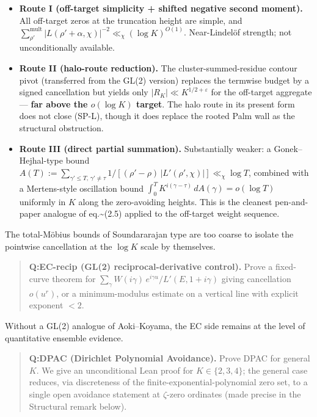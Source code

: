 \begin{itemize}
\item
  \textbf{Route I (off-target simplicity + shifted negative second
  moment).} All off-target zeros at the truncation height are
  simple, and
  \(\sum_{\rho'}^\mathrm{mult} |L(\rho' + \alpha,\chi)|^{-2} \ll_\chi (\log K)^{O(1)}\).
  Near-Lindelöf strength; not unconditionally available.
\item
  \textbf{Route II (halo-route reduction).} The cluster-summed-residue
  contour pivot (transferred from the GL(2) version) replaces the
  termwise budget by a signed cancellation but yields only
  \(|R_K| \ll K^{1/2 + \varepsilon}\) for the off-target aggregate ---
  \textbf{far above the \(o(\log K)\) target}. The halo route in its
  present form does not close (SP-L), though it does replace the
  rooted Palm wall as the structural obstruction.
\item
  \textbf{Route III (direct partial summation).} Substantially weaker:
  a Gonek--Hejhal-type bound
  \(A(T) := \sum_{\gamma' \le T,\, \gamma' \ne \tau}
  1/[(\rho' - \rho)\,|L'(\rho', \chi)|] \ll_\chi \log T\), combined
  with a Mertens-style oscillation bound
  \(\int_0^T K^{i(\gamma - \tau)}\, dA(\gamma) = o(\log T)\) uniformly
  in \(K\) along the zero-avoiding heights. This is the cleanest
  pen-and-paper analogue of \cite{AkatsukaH2013EulerProduct} eq.\textasciitilde(2.5) applied to the
  off-target weight sequence.
\end{itemize}

The total-Möbius bounds of Soundararajan type are too coarse to
isolate the pointwise cancellation at the \(\log K\) scale by
themselves.

\begin{quote}
\textbf{Q:EC-recip (GL(2) reciprocal-derivative control).} Prove a
fixed-curve theorem for
\(\sum_\gamma \widehat W(i\gamma)\,e^{i\gamma u} / L'(E, 1 + i\gamma)\)
giving cancellation \(o(u^r)\), or a minimum-modulus estimate
on a vertical line with explicit exponent \(< 2\).
\end{quote}

Without a GL(2) analogue of Aoki--Koyama, the EC side remains at the
level of quantitative ensemble evidence.

\begin{quote}
\textbf{Q:DPAC (Dirichlet Polynomial Avoidance).} Prove DPAC for
general \(K\). We give an unconditional Lean proof for
\(K \in \{2, 3, 4\}\); the general case reduces, via \cite{Polya1913}
discreteness of the finite-exponential-polynomial zero set, to
a single open avoidance statement at \(\zeta\)-zero ordinates
(made precise in the Structural remark below).
\end{quote}

